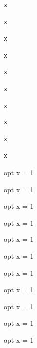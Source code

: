 \documentclass[11pt]{article}
\begin{document}
\begin{verbatim}
x
\end{verbatim}
\begin{verbatim}
x
\end{verbatim}
\begin{verbatim}
x
\end{verbatim}
\begin{verbatim}
x
\end{verbatim}
\begin{verbatim}
x
\end{verbatim}
\begin{verbatim}
x
\end{verbatim}
\begin{verbatim}
x
\end{verbatim}
\begin{verbatim}
x
\end{verbatim}
\begin{verbatim}
x
\end{verbatim}
\begin{verbatim}
x
\end{verbatim}
\begin{pycode}{opt}
x = 1
\end{pycode}
\begin{pyblock*}{opt}
x = 1
\end{pyblock*}
\begin{juliacode}{opt}
x = 1
\end{juliacode}
\begin{jlcode}{opt}
x = 1
\end{jlcode}
\begin{javacode}{opt}
x = 1
\end{javacode}
\begin{luacode*}{opt}
x = 1
\end{luacode*}
\begin{pylabcode}{opt}
x = 1
\end{pylabcode}
\begin{sageblock}{opt}
x = 1
\end{sageblock}
\begin{scalacode}{opt}
x = 1
\end{scalacode}
\begin{sympycode}{opt}
x = 1
\end{sympycode}
\begin{hscode}{opt}
x = 1
\end{hscode}
\end{document}
